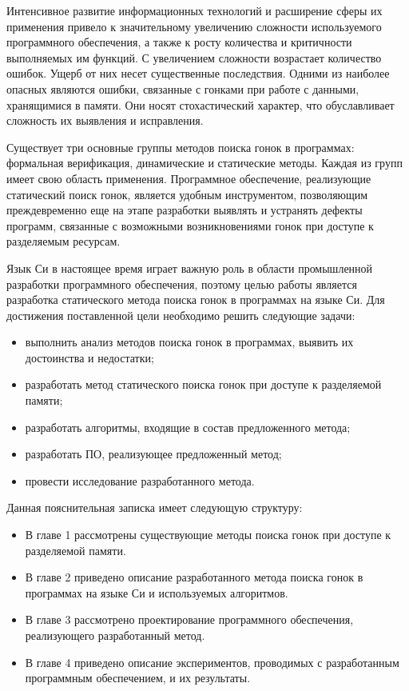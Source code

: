 \Introduction

Интенсивное развитие информационных технологий и расширение сферы их применения привело к значительному увеличению сложности используемого программного обеспечения, а также к росту количества и критичности выполняемых им функций. С увеличением сложности возрастает количество ошибок. Ущерб от них несет существенные последствия. Одними из наиболее опасных являются ошибки, связанные с гонками при работе с данными, хранящимися в памяти. Они носят стохастический характер, что обуславливает сложность их выявления и исправления.

Существует три основные группы методов поиска гонок в программах: формальная верификация, динамические и статические методы. Каждая из групп имеет свою область применения. Программное обеспечение, реализующие статический поиск гонок, является удобным инструментом, позволяющим преждевременно еще на этапе разработки выявлять и устранять дефекты программ, связанные с возможными возникновениями гонок при доступе к разделяемым ресурсам.

Язык Си в настоящее время играет важную роль в области промышленной разработки программного обеспечения, поэтому целью работы является разработка статического метода поиска гонок в программах на языке Си. Для достижения поставленной цели необходимо решить следующие задачи:

\begin{itemize}
\item выполнить анализ методов поиска гонок в программах, выявить их достоинства и недостатки;
\item разработать метод статического поиска гонок при доступе к разделяемой памяти;
\item разработать алгоритмы, входящие в состав предложенного метода;
\item разработать ПО, реализующее предложенный метод;
\item провести исследование разработанного метода.
\end{itemize}

Данная пояснительная записка имеет следующую структуру:

\begin{itemize}
  \item В главе 1 рассмотрены существующие методы поиска гонок при доступе к разделяемой памяти.
  \item В главе 2 приведено описание разработанного метода поиска гонок в программах на языке Си и используемых алгоритмов.
  \item В главе 3 рассмотрено проектирование программного обеспечения, реализующего разработанный метод.
  \item В главе 4 приведено описание экспериментов, проводимых с разработанным программным обеспечением, и их результаты.
\end{itemize}
